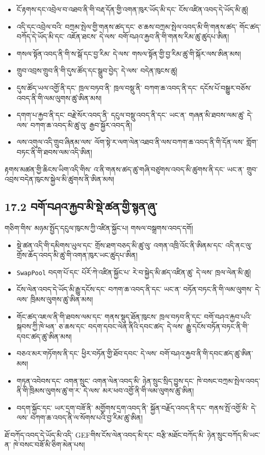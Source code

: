 \documentclass[11pt]{article}
\begin{document}
\begin{itemize}[leftmargin=*]
\item ངོ་རྟགས་དང་འབྲེལ་བ་འཐབ་ནི་གི་བརྡ་དོན་གྱི་འགན་ཁུར་ཡོད་མི་དང་ ངོས་འཛིན་འབད་དེ་ཡོད་མི་ཚུ།
\item འདི་དང་འབྲེལ་བའི་ བཀྲམ་སྤེལ་གྱི་གནས་ཚད་དང་ ཅ་ཆས་བཀྲམ་སྤེལ་འབད་མི་གི་གནས་ཚད་ གོང་ཚད་བཀོད་དེ་ཡོད་མི་དང་ འཇོན་ཐངས་ དེ་ལས་ བགོ་བཤའ་རྐྱབ་ནི་གི་གནས་རིམ་ཚུ་ཚུདཔ་ཨིན།
\item གསལ་སྟོན་འབད་ནི་གི་ས་སྒོ་དང་བྱ་རིམ་ དེ་ལས་ གསལ་སྟོན་གྱི་བྱ་རིམ་ཚུ་གི་སྐོར་ལས་ཨིན་མས།
\item གྲུབ་འབྲས་གྲུབ་ནི་གི་དུས་ཚོད་དང་སྒྲུབ་བྱེད་ དེ་ལས་ བདེན་ཁུངས་ཚུ།
\item དུས་ཚོད་ཡལ་འགྱོ་ནི་དང་ ཁྲལ་བཏབ་ནི་ ཁྲལ་བསྡུ་ནི་ བཀག་ཆ་འབད་ནི་དང་ དངོས་པོ་བསྒྱུར་བཅོས་འབད་ནི་གི་ལམ་ལུགས་ཚུ་ཨིན་མས།
\item དགག་པ་རྐྱབ་ནི་དང་ བརྗེ་སོར་འབད་ནི་ དངུལ་བསྡུ་འབད་ནི་དང་ ཡང་ན་ གཞན་མི་ཐབས་ལམ་ཚུ་ དེ་ལས་ བཀག་ཆ་འབད་མི་ཚུ་ལུ་ རྒྱབ་སྐྱོར་འབད་ནི།
\item ལས་འགུལ་འདི་གྲུབ་ཞིནམ་ལས་ ལོག་སྟེ་ར་ལག་ལེན་འཐབ་ནི་ལས་བཀག་ཆ་འབད་ནི་གི་དོན་ལས་ གློག་བཏང་ནི་གི་ཐབས་ལམ་འདི་ཨིན།
\end{itemize}
རྟགས་མཚན་གྱི་ཆིངས་ཡིག་འདི་གིས་ འ་ནི་གནས་ཚད་ཚུ་གཞི་བཙུགས་འབད་མི་ཚུགས་ནི་དང་ ཡང་ན་ གྲུབ་འབྲས་བདེན་ཁུངས་སྐྱེལ་མི་ཚུགས་ནི་ཨིན་མས།

\subsection*{17.2 བགོ་བཤའ་རྐྱབ་མི་སྡེ་ཚན་གྱི་སྙན་ཞུ་}

གཅིག་གིས་ མཉམ་སྤྱོད་དངུལ་ཁུངས་ཀྱི་འཛིན་སྐྱོང་པ། གསལ་བསྒྲགས་འབད་དགོ།

\begin{itemize}[leftmargin=*]
\item སྡེ་ཚན་འདི་གི་དམིགས་ཡུལ་དང་ གྲོས་ཐག་བཅད་མི་ཚུ་ལུ་ འགན་འཁྲི་འོང་ནི་ཨིནམ་དང་ འདི་ནང་ལུ་ གྲོས་ཆོད་འབད་མི་ཚུ་གི་འགན་ཁུར་ཡང་ཚུདཔ་ཨིན།
\item \texttt{SwapPool} བདག་པོ་དང་ པོརོ་ཀེ་འཛིན་སྐྱོང་པ་ རེ་བ་སྐྱེད་མི་ཚད་འཛིན་ཚུ་ དེ་ལས་ ཁྲལ་ལེན་མི་ཚུ།
\item ངོས་ལེན་འབད་དེ་ཡོད་མི་རྒྱུ་དངོས་དང་ བཀག་ཆ་འབད་ནི་དང་ ཡང་ན་ བཏོན་བཏང་ནི་གི་ལམ་ལུགས་ དེ་ལས་ ཁྲིམས་ལུགས་ཚུ་ཨིན་མས།
\item གོང་ཚད་འཇལ་ནི་གི་ཐབས་ལམ་དང་ གནས་སྡུད་ཐོན་ཁུངས་ ཁྲལ་བཏབ་ནི་དང་ བགོ་བཤའ་རྐྱབ་པའི་སྐབས་ཀྱི་ཁེ་ཕན་ ཅ་ཆས་དང་ བདག་དབང་ལེན་ནིའི་དབང་ཚད་ དེ་ལས་ རྒྱུ་དངོས་བཏོན་བཏང་ནི་གི་དབང་ཚད་ཚུ་ཨིན་མས།
\item བཅའ་མར་གཏོགས་ནི་དང་ ཕྱིར་བཏོན་གྱི་ཐོབ་དབང་ དེ་ལས་ བགོ་བཤའ་རྐྱབ་ནི་གི་དབང་ཚད་ཚུ་ཨིན་མས།
\item གཏན་འབེབས་དང་ འགན་སྲུང་ འགན་ལེན་འབད་མི་ ཉེན་སྲུང་སྲིད་བྱུས་དང་ ཁེ་བསང་བཀྲམ་སྤེལ་འབད་ནི་གི་ཁྲིམས་ལུགས་ཚུ་ག་ར་ དེ་ལས་ མར་ཕབ་འགྱོ་ནི་གི་ལམ་ལུགས་ཚུ་ཨིན།
\item བདག་སྐྱོང་དང་ ཡར་དྲག་བཟོ་ནི་ མགྱོགས་དྲག་འབད་ནི་ སྐྱོན་བརྗོད་འབད་ནི་དང་ གནས་སྤོ་འགྱོ་མི་ དེ་ལས་ བཀག་ཆ་འབད་ནི་ལ་སོགས་པའི་བྱ་རིམ་ཚུ་ཨིན།
\end{itemize}
ཐོ་བཀོད་འབད་དེ་ཡོད་མི་འདི་ GEFགིས་ངོས་ལེན་འབད་མི་དང་ བརྩི་མཐོང་བཀོད་མི་ ཉེན་སྲུང་བཀོད་མི་ཡང་ན་ ཁེ་བསང་བཟོ་མི་ཅིག་མེན་པས།
\end{document}
